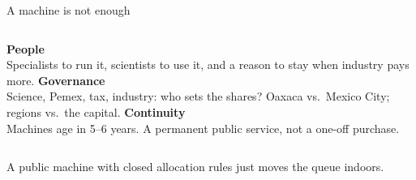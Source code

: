 \documentclass[aspectratio=169]{beamer}
\begin{document}
\begin{frame}{A machine is not enough}
\begin{columns}[T]
{\Large\bfseries\color{cookieAccent}People}\\[4pt]
\small Specialists to run it, scientists to use it, and a reason to stay when industry pays more.
{\Large\bfseries\color{cookieAccent}Governance}\\[4pt]
\small Science, Pemex, tax, industry: who sets the shares? Oaxaca vs.\ Mexico City; regions vs.\ the capital.
{\Large\bfseries\color{cookieAccent}Continuity}\\[4pt]
\small Machines age in 5--6 years. A permanent public service, not a one-off purchase.
\end{columns}
\vspace{1.5em}
\begin{center}\color{cookieMuted}A public machine with closed allocation rules just moves the queue indoors.\end{center}
\end{frame}
\end{document}
